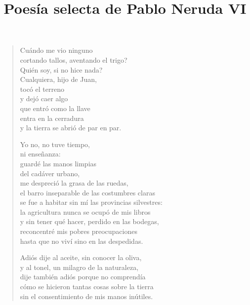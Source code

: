 \documentclass[12pt]{article}
\date{}
\title{Poesía selecta de Pablo Neruda VI}
\begin{document}
\maketitle
\tableofcontents
\clearpage
{}
\begin{verse}

Cuándo me vio ninguno\\
cortando tallos, aventando el trigo?\\
Quién soy, si no hice nada?\\
Cualquiera, hijo de Juan,\\
tocó el terreno\\
y dejó caer algo\\
que entró como la llave\\
entra en la cerradura\\
y la tierra se abrió de par en par.  

Yo no, no tuve tiempo,\\
ni enseñanza:\\
guardé las manos limpias\\
del cadáver urbano,\\
me despreció la grasa de las ruedas,\\
el barro inseparable de las costumbres claras\\
se fue a habitar sin mí las provincias silvestres:\\
la agricultura nunca se ocupó de mis libros\\
y sin tener qué hacer, perdido en las bodegas,\\
reconcentré mis pobres preocupaciones\\
hasta que no viví sino en las despedidas.  

Adiós dije al aceite, sin conocer la oliva,\\
y al tonel, un milagro de la naturaleza,\\
dije también adiós porque no comprendía\\
cómo se hicieron tantas cosas sobre la tierra\\
sin el consentimiento de mis manos inútiles.  

\end{verse}
\end{document}

